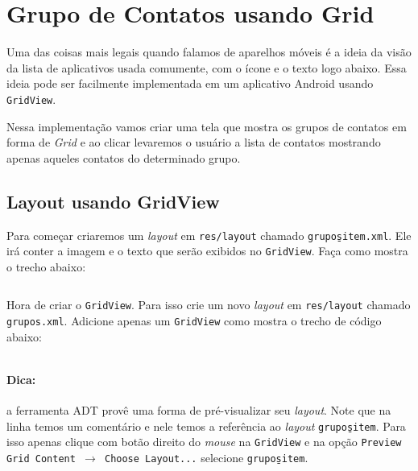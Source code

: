 \section{Grupo de Contatos usando Grid}

Uma das coisas mais legais quando falamos de aparelhos móveis é a ideia da visão da lista de aplicativos
usada comumente, com o ícone e o texto logo abaixo. Essa ideia pode ser facilmente implementada em
um aplicativo Android usando \texttt{GridView}.

Nessa implementação vamos criar uma tela que mostra os grupos de contatos em forma de \textit{Grid}
e ao clicar levaremos o usuário a lista de contatos mostrando apenas aqueles contatos do determinado
grupo.

\subsection{Layout usando GridView}

Para começar criaremos um \textit{layout} em \texttt{res/layout} chamado \texttt{grupos\b{ }item.xml}.
Ele irá conter a imagem e o texto que serão exibidos no \texttt{GridView}. Faça como mostra o trecho abaixo:

\begin{listing}[H]
  \inputminted[linenos=true,frame=bottomline,tabsize=3]{ xml }{ source/grupos_item-1.xml }
  \caption{Item do Layout de Grupos [res/layout/grupos\b{ }item.xml]}
\end{listing}

Hora de criar o \texttt{GridView}. Para isso crie um novo \textit{layout} em \texttt{res/layout} chamado
\texttt{grupos.xml}. Adicione apenas um \texttt{GridView} como mostra o trecho de código abaixo:

\begin{listing}[H]
  \inputminted[linenos=true,frame=bottomline,tabsize=3]{ xml }{ source/grupos-1.xml }
  \caption{Layout de Grupos [res/layout/grupos.xml]}
\end{listing}

\paragraph{Dica:} a ferramenta ADT provê uma forma de pré-visualizar seu \textit{layout}. Note que
na linha  temos um comentário e nele temos a referência ao \textit{layout}
\texttt{grupos\b{ }item}. Para isso apenas clique com botão direito do \textit{mouse} na \texttt{GridView}
e na opção \texttt{Preview Grid Content $\rightarrow$ Choose Layout...} selecione \texttt{grupos\b{ }item}.

